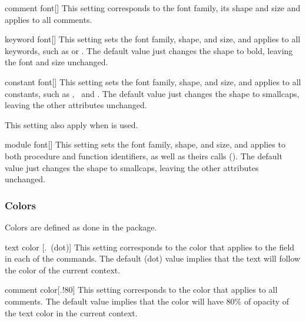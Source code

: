 \documentclass[a4paper, 11pt]{article}
\begin{document}
\begin{option}{comment font}{}[]
    This setting corresponds to the font family, its shape and size and applies to all comments.
\end{option}

\begin{option}{keyword font}{}[]
    This setting sets the font family, shape, and size, and applies to all keywords, such as  or . The default value just changes the shape to bold, leaving the font and size unchanged.
\end{option}

\begin{option}{constant font}{}[]
    This setting sets the font family, shape, and size, and applies to all constants, such as \Nil, \True\ and \False. The default value just changes the shape to smallcaps, leaving the other attributes unchanged.

    This setting also apply when  is used.
\end{option}

\begin{option}{module font}{}[]
    This setting sets the font family, shape, and size, and applies to both procedure and function identifiers, as well as theirs calls (). The default value just changes the shape to smallcaps, leaving the other attributes unchanged.
\end{option}

\subsubsection{Colors}
Colors are defined as done in the  package.

\begin{option}{text color}{}
    [.\mbox{\normalfont\normalcolor\normalsize~(dot)}]
    This setting corresponds to the color that applies to the  field in each of the commands. The default  (dot) value implies that the text will follow the color of the current context.
\end{option}

\begin{option}{comment color}{}[.!80]
    This setting corresponds to the color that applies to all comments. The default value implies that the color will have 80\% of opacity of the text color in the current context.
\end{option}
\end{document}
